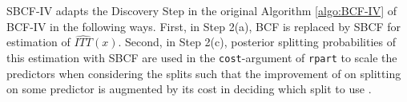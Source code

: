 SBCF-IV adapts the Discovery Step in the original Algorithm \ref{algo:BCF-IV} of BCF-IV in the following ways. First, in Step 2(a), BCF \citep{hahn_bayesian_2020} is replaced by SBCF for estimation of $\widehat{ITT}(x)$. Second, in Step 2(c), posterior splitting probabilities of this estimation with SBCF are used in the \texttt{cost}-argument of \texttt{rpart} to scale the predictors when considering the splits such that the improvement of on splitting on some predictor is augmented by its cost in deciding which split to use \cite{therneau}. 






